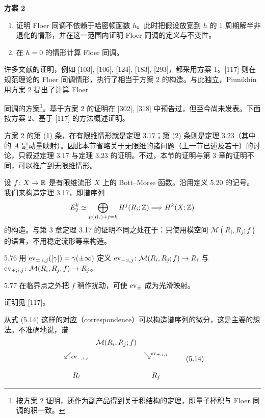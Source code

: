 \textbf{方案 2}
\begin{enumerate}[label=(\arabic*),leftmargin=2.4em,itemsep=1pt,topsep=2pt]
  \item 证明 Floer 同调不依赖于哈密顿函数 $h$。此时把假设放宽到 $h$ 的 1 周期解半非退化的情形，并在这一范围内证明 Floer 同调的定义与不变性。
  \item 在 $h=0$ 的情形计算 Floer 同调。
\end{enumerate}

许多文献的证明，例如 [103], [106], [124], [183], [293]，都采用方案 1。[117] 则在规范理论的 Floer 同调情形，执行了相当于方案 2 的构造。与此独立，Piunikhin 用方案 2 提出了计算 Floer

同调的方案\footnote{按方案 2 证明，还作为副产品得到关于积结构的定理，即量子杯积与 Floer 同调的积一致。}。基于方案 2 的证明在 [302], [318] 中预告过，但至今尚未发表。下面按方案 2、基于 [117] 的方法概述证明。

方案 2 的第 (1) 条，在有限维情形就是定理 3.17；第 (2) 条则是定理 3.23（其中的 $A$ 是动量映射）。因此本节省略关于无限维的诸问题（上一节已述及若干）的讨论，只叙述定理 3.17 与定理 3.23 的证明。不过，本节的证明与第 3 章的证明不同，可以推广到无限维情形。

设 $f\colon X\to\mathbb{R}$ 是有限维流形 $X$ 上的 Bott–Morse 函数。沿用定义 5.20 的记号。我们来构造定理 3.17，即谱序列
\[
E_2^k\simeq\bigoplus_{\mu(R_i)+j=k}H^j(R_i;\mathbb{Z})\Longrightarrow H^k(X;\mathbb{Z})
\]
的构造。与第 3 章定理 3.17 的证明不同之处在于：只使用模空间 $\mathcal{M}(R_i,R_j;f)$ 的语言，不用稳定流形等来构造。

\begin{definition}{5.76}
  用 $\operatorname{ev}_{\pm;i,j}([\gamma])=\gamma(\pm\infty)$ 定义 $\operatorname{ev}_{-;i,j}\colon\mathcal{M}(R_i,R_j;f)\to R_i$ 与 $\operatorname{ev}_{+;i,j}\colon\mathcal{M}(R_i,R_j;f)\to R_j$。
\end{definition}

\begin{lemma}{5.77}
  在临界点之外把 $f$ 稍作扰动，可使 $\operatorname{ev}_\pm$ 成为光滑映射。
\end{lemma}

证明见 [117]。

从式 (5.14) 这样的对应（correspondence）可以构造谱序列的微分，这是主要的想法。不准确地说，谱
\begin{equation}
\begin{array}{ccc}
  & \mathcal{M}(R_i,R_j;f) & \\[6pt]
  \swarrow_{\scriptstyle \operatorname{ev}_{-,i,j}} & & \searrow^{\scriptstyle \operatorname{ev}_{+,i,j}}\\[16pt]
  R_i & & R_j
\end{array}
\tag{5.14}
\end{equation}

